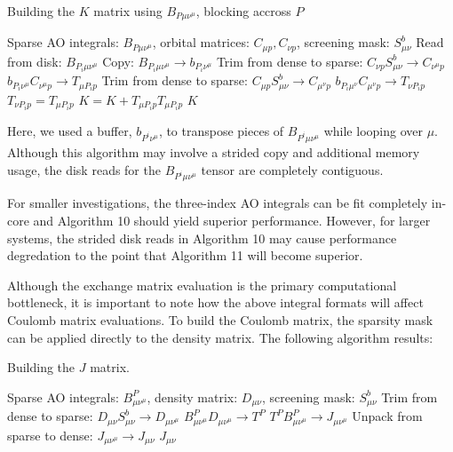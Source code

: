 \begin{algorithm}[H]
\caption{Building the $K$ matrix using $B_{P \mu \nu^\mu}$, blocking accross $P$}
\begin{algorithmic}
\REQUIRE Sparse AO integrals: $B_{P \mu \nu^\mu}$, orbital matrices: $C_{\mu p}, C_{\nu p}$, screening mask: $S_{\mu \nu}^b$
    \STATE Read from disk: $B_{P_i \mu \nu^{\mu}}$
        \STATE Copy: $B_{P_i \mu \nu^{\mu}} \rightarrow b_{P_i \nu^{\mu}}$
        \STATE Trim from dense to sparse: $C_{\nu p}S_{\mu \nu}^b \rightarrow C_{\nu^{\mu} p}$
        \STATE $b_{P_i \nu^{\mu}} C_{\nu^{\mu} p} \rightarrow T_{\mu P_i p}$
            \STATE Trim from dense to sparse: $C_{\mu p}S_{\mu \nu}^b \rightarrow C_{\mu^{\nu} p}$
            \STATE $b_{P_i \mu^{\nu}} C_{\mu^{\nu} p} \rightarrow T_{\nu P_i p}$
        \ELSE
            \STATE $T_{\nu P_i p} = T_{\mu P_i p}$ 
        \ENDIF
    \ENDFOR
    \STATE $K = K +  T_{\mu P_i p} T_{\mu P_i p} $
\ENDFOR
\RETURN $K$
\end{algorithmic}
\end{algorithm}

\noindent Here, we used a buffer, $b_{P^i \nu^{\mu}}$, to transpose pieces of $B_{P^i \mu \nu^{\mu}}$ while looping over $\mu$.
Although this algorithm may involve a strided copy and additional memory usage, the disk reads for the $B_{P^i \mu \nu^{\mu}}$ 
tensor are completely contiguous.  

For smaller investigations, the three-index AO integrals can be fit completely in-core and Algorithm 10 should yield superior 
performance. However, for larger systems,
the strided disk reads in Algorithm 10 may cause performance degredation to the point that Algorithm 11 will become superior.

Although the exchange matrix evaluation is the primary computational bottleneck, it is important to note how the above integral
formats will affect Coulomb matrix evaluations. To build the Coulomb matrix, the sparsity mask can be applied
directly to the density matrix. The following algorithm results:

\begin{algorithm}[H]
\caption{Building the $J$ matrix.}
\begin{algorithmic}
\REQUIRE Sparse AO integrals: $B_{\mu \nu^{\mu}}^P$, density matrix: $D_{\mu \nu}$, screening mask: $S_{\mu \nu}^b$
\STATE Trim from dense to sparse: $D_{\mu \nu}S_{\mu \nu}^b \rightarrow D_{\mu \nu^{\mu} }$
\STATE $B^P_{\mu\nu^{\mu}} D_{\mu \nu^{\mu}} \rightarrow T^{P}$
\STATE $T^{P} B^P_{\mu \nu^{\mu}} \rightarrow J_{\mu \nu^{\mu}} $
\STATE Unpack from sparse to dense: $J_{\mu \nu^{\mu}} \rightarrow J_{\mu \nu}$
\RETURN $J_{\mu \nu}$
\end{algorithmic}
\end{algorithm}

